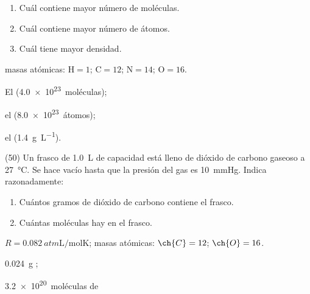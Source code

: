 \documentclass[10pt]{article}
\newenvironment{gexdatos}{
    \noindent\makebox[0pt][r]{\textit{Datos:}}
}{\vspace{5pt}}
\begin{document}
\begin{multicols}{2}
\begin{exercise}
  \begin{enumerate}
    \item Cuál contiene mayor número de moléculas.
    \item Cuál contiene mayor número de átomos.
    \item Cuál tiene mayor densidad.
  \end{enumerate}

  \begin{gexdatos}
    masas atómicas: \( \textrm{H} = 1 \); \( \textrm{C} = 12 \); \( \textrm{N} = 14 \); \( \textrm{O} = 16 \).
  \end{gexdatos}
\end{exercise}

\begin{solution}
  \begin{enumerate*}
    \item El  (\SI{4.0e23}{moléculas});
    \item el  (\SI{8.0e23}{átomos});
    \item el  (\SI{1.4}{\gram\per\liter}).
  \end{enumerate*}
\end{solution}


\begin{exercise}
  (50) Un frasco de \SI{1.0}{\liter} de capacidad está lleno de dióxido de carbono gaseoso a \SI{27}{\celsius}. Se hace vacío hasta que la presión del
  gas es \SI{10}{\mmHg}. Indica razonadamente:

  \begin{enumerate}
    \item Cuántos gramos de dióxido de carbono contiene el frasco.
    \item Cuántas moléculas hay en el frasco.
  \end{enumerate}

  \begin{gexdatos}
    \( R = \SI{0.082}{atm\liter\per\mole\kelvin} \); masas atómicas: \( \ch{C} = 12 \); \( \ch{O} = 16 \).
  \end{gexdatos}
\end{exercise}

\begin{solution}
  \begin{enumerate*}
    \item \SI{0.024}{\gram} ;
    \item \SI{3.2e20}{moléculas} de 
  \end{enumerate*}
\end{solution}

\end{multicols}
\end{document}
